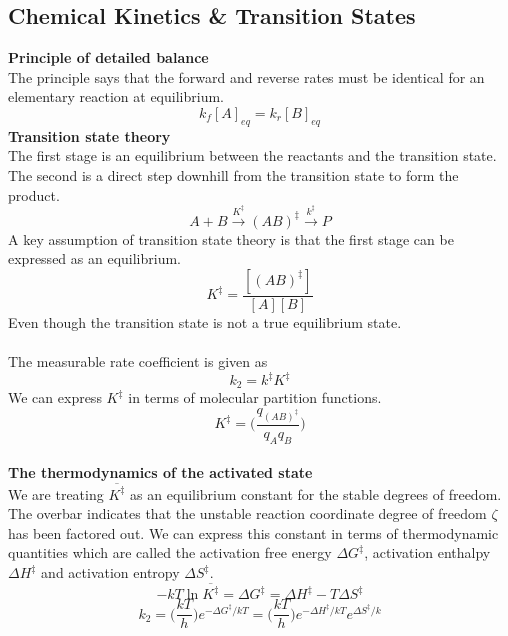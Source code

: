 \documentclass[8pt]{article}
\numberwithin{equation}{section}
\begin{document}
\begin{multicols}{2}
\setcounter{section}{18}
\section{Chemical Kinetics \& Transition States}
\textbf{Principle of detailed balance} \\
The principle says that the forward and reverse rates must be identical for an elementary reaction at equilibrium. 
\begin{equation}
k_{f}[A]_{eq}=k_{r}[B]_{eq} \tag{19.4}
\end{equation}
\textbf{Transition state theory} \\
The first stage is an equilibrium between the reactants and the transition state. The second is a direct step downhill from the transition state to form the product. 
\begin{equation}
A+B\xrightarrow{K^{\ddagger}}(AB)^{\ddagger}\xrightarrow{k^{\ddagger}}P \tag{19.13}
\end{equation}
A key assumption of transition state theory is that the first stage can be expressed as an equilibrium. 
\begin{equation}
K^{\ddagger}=\frac{[(AB)^{\ddagger}]}{[A][B]} \tag{19.14}
\end{equation}
Even though the transition state is not a true equilibrium state. 	\\ \\
The measurable rate coefficient is given as 
\begin{equation}
k_{2}=k^{\ddagger}K^{\ddagger} \tag{19.16}
\end{equation}
We can express $K^{\ddagger}$ in terms of molecular partition functions.
\begin{equation}
K^{\ddagger}=\bigg(\frac{q_{(AB)^{\ddagger}}}{q_{A}q_{B}}\bigg) \tag{19.17}
\end{equation} 
\pagebreak \\
\textbf{The thermodynamics of the activated state}\\
We are treating $\overline{K^{\ddagger}}$ as an equilibrium constant for the stable degrees of freedom. The overbar indicates that the unstable reaction coordinate degree of freedom $\zeta$ has been factored out. We can express this constant in terms of thermodynamic quantities which are called the activation free energy $\Delta G^{\ddagger}$, activation enthalpy $\Delta H^{\ddagger}$ and activation entropy $\Delta S^{\ddagger}$. 
\begin{equation}
-kT\ln{\overline{K^{\ddagger}}}=\Delta G^{\ddagger}=\Delta H^{\ddagger}-T\Delta S^{\ddagger} \tag{19.25}
\end{equation}
\begin{equation}
k_{2}=\bigg(\frac{kT}{h}\bigg)e^{-\Delta G^{\ddagger}/kT}=\bigg(\frac{kT}{h} \bigg)e^{-\Delta H^{\ddagger}/kT}e^{\Delta S^{\ddagger}/k} \tag{19.26}
\end{equation}

\end{multicols}
\end{document}
